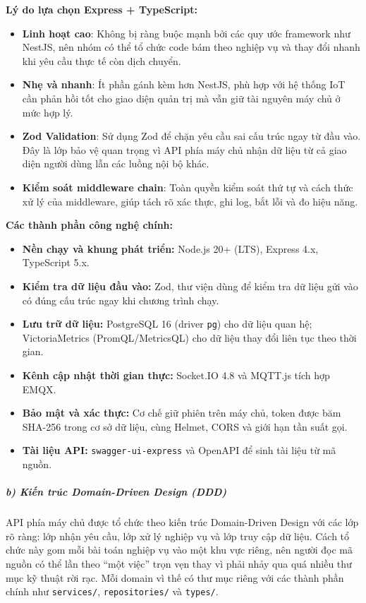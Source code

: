 \documentclass[a4paper]{extarticle}
\providecommand{\tightlist}{%
  \setlength{\itemsep}{0pt}\setlength{\parskip}{0pt}}
\begin{document}
\textbf{Lý do lựa chọn Express + TypeScript:}

\begin{itemize}
\tightlist
\item
  \textbf{Linh hoạt cao}: Không bị ràng buộc mạnh bởi các quy ước
  framework như NestJS, nên nhóm có thể tổ chức code bám theo nghiệp vụ
  và thay đổi nhanh khi yêu cầu thực tế còn dịch chuyển.
\item
  \textbf{Nhẹ và nhanh}: Ít phần gánh kèm hơn NestJS, phù hợp với hệ thống
  IoT cần phản hồi tốt cho giao diện quản trị mà vẫn giữ tài
  nguyên máy chủ ở mức hợp lý.
\item
  \textbf{Zod Validation}: Sử dụng Zod để chặn yêu cầu sai cấu trúc ngay
  từ đầu vào. Đây là lớp bảo vệ quan trọng vì API phía máy chủ nhận dữ
  liệu từ cả giao diện người dùng lẫn các luồng nội bộ khác.
\item
  \textbf{Kiểm soát middleware chain}: Toàn quyền kiểm soát thứ tự và
  cách thức xử lý của middleware, giúp tách rõ xác thực, ghi log, bắt
  lỗi và đo hiệu năng.
\end{itemize}

\textbf{Các thành phần công nghệ chính:}

\begin{itemize}
\tightlist
\item
  \textbf{Nền chạy và khung phát triển:} Node.js 20+ (LTS), Express 4.x, TypeScript
  5.x.
\item
  \textbf{Kiểm tra dữ liệu đầu vào:} Zod, thư viện dùng để kiểm tra dữ
  liệu gửi vào có đúng cấu trúc ngay khi chương trình chạy.
\item
  \textbf{Lưu trữ dữ liệu:} PostgreSQL 16 (driver \texttt{pg}) cho dữ liệu quan
  hệ; VictoriaMetrics (PromQL/MetricsQL) cho dữ liệu thay đổi liên tục theo thời gian.
\item
  \textbf{Kênh cập nhật thời gian thực:} Socket.IO 4.8 và MQTT.js tích hợp EMQX.
\item
  \textbf{Bảo mật và xác thực:} Cơ chế giữ phiên trên máy chủ, token được băm
  SHA-256 trong cơ sở dữ liệu, cùng Helmet, CORS và giới hạn tần suất gọi.
\item
  \textbf{Tài liệu API:} \texttt{swagger-ui-express} và OpenAPI để sinh tài liệu từ mã nguồn.
\end{itemize}

\subparagraph{b) Kiến trúc Domain-Driven Design
(DDD)}\label{b-kiux1ebfn-truxfac-domain-driven-design-ddd-1}

API phía máy chủ được tổ chức theo kiến trúc Domain-Driven Design với
các lớp rõ ràng: lớp nhận yêu cầu, lớp xử lý nghiệp vụ và lớp truy cập
dữ liệu. Cách tổ chức này gom mỗi bài toán nghiệp vụ vào một khu vực
riêng, nên người đọc mã nguồn có thể lần theo ``một việc'' trọn vẹn
thay vì phải nhảy qua quá nhiều thư mục kỹ thuật rời rạc. Mỗi domain vì
thế có thư mục riêng với các thành phần chính như \texttt{services/},
\texttt{repositories/} và \texttt{types/}.
\end{document}
